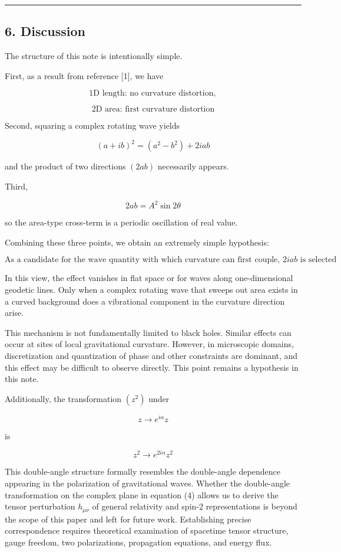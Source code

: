 \documentclass[
  a4paper,
]{article}
\begin{document}
\begin{center}\rule{0.5\linewidth}{0.5pt}\end{center}

\subsection{6. Discussion}\label{discussion}

The structure of this note is intentionally simple.

First, as a result from reference {[}1{]}, we have

\[\text{1D length: no curvature distortion},\]

\[\text{2D area: first curvature distortion}\]

Second, squaring a complex rotating wave yields

\[(a+ib)^2=(a^2-b^2)+2iab\]

and the product of two directions \((2ab)\) necessarily appears.

Third,

\[2ab=A^2\sin2\theta\]

so the area-type cross-term is a periodic oscillation of real value.

Combining these three points, we obtain an extremely simple hypothesis:

\[\boxed{\text{As a candidate for the wave quantity with which curvature can first couple, }2iab\text{ is selected}}\]

In this view, the effect vanishes in flat space or for waves along
one-dimensional geodetic lines. Only when a complex rotating wave that
sweeps out area exists in a curved background does a vibrational
component in the curvature direction arise.

This mechanism is not fundamentally limited to black holes. Similar
effects can occur at sites of local gravitational curvature. However, in
microscopic domains, discretization and quantization of phase and other
constraints are dominant, and this effect may be difficult to observe
directly. This point remains a hypothesis in this note.

Additionally, the transformation \((z^2)\) under

\[z\rightarrow e^{i\alpha}z\]

is

\[z^2\rightarrow e^{2i\alpha}z^2\]

This double-angle structure formally resembles the double-angle
dependence appearing in the polarization of gravitational waves. Whether
the double-angle transformation on the complex plane in equation (4)
allows us to derive the tensor perturbation \(h_{\mu\nu}\) of general
relativity and spin-2 representations is beyond the scope of this paper
and left for future work. Establishing precise correspondence requires
theoretical examination of spacetime tensor structure, gauge freedom,
two polarizations, propagation equations, and energy flux.
\end{document}
